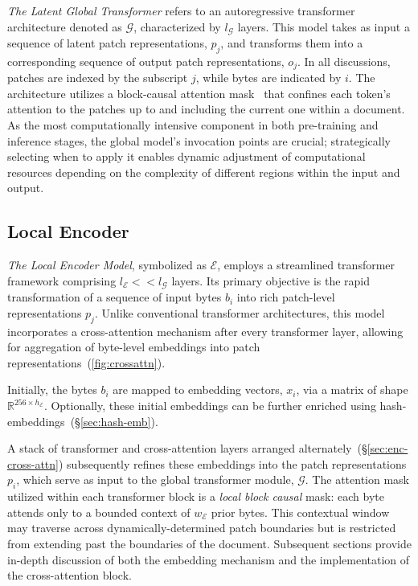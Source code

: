 \textit{The Latent Global Transformer} refers to an autoregressive transformer architecture denoted as $\mathcal{G}$, characterized by $l_{\mathcal{G}}$ layers. This model takes as input a sequence of latent patch representations, $p_j$, and transforms them into a corresponding sequence of output patch representations, $o_j$. In all discussions, patches are indexed by the subscript $j$, while bytes are indicated by $i$. The architecture utilizes a block-causal attention mask~\citep{dubey2024llama} that confines each token’s attention to the patches up to and including the current one within a document. As the most computationally intensive component in both pre-training and inference stages, the global model's invocation points are crucial; strategically selecting when to apply it enables dynamic adjustment of computational resources depending on the complexity of different regions within the input and output.

\subsection{Local Encoder}
\label{section:local}

\textit{The Local Encoder Model}, symbolized as $\mathcal{E}$, employs a streamlined transformer framework comprising $l_{\mathcal{E}} << l_{\mathcal{G}}$ layers. Its primary objective is the rapid transformation of a sequence of input bytes $b_i$ into rich patch-level representations $p_j$. Unlike conventional transformer architectures, this model incorporates a cross-attention mechanism after every transformer layer, allowing for aggregation of byte-level embeddings into patch representations~(\autoref{fig:crossattn}).

Initially, the bytes $b_i$ are mapped to embedding vectors, $x_i$, via a matrix of shape $\mathbb{R}^{256 \times h_{\mathcal{E}}}$. Optionally, these initial embeddings can be further enriched using hash-embeddings~(\S\ref{sec:hash-emb}). 

A stack of transformer and cross-attention layers arranged alternately~(\S\ref{sec:enc-cross-attn}) subsequently refines these embeddings into the patch representations $p_i$, which serve as input to the global transformer module, $\mathcal{G}$. The attention mask utilized within each transformer block is a \textit{local block causal} mask: each byte attends only to a bounded context of $w_{\mathcal{E}}$ prior bytes. This contextual window may traverse across dynamically-determined patch boundaries but is restricted from extending past the boundaries of the document. Subsequent sections provide in-depth discussion of both the embedding mechanism and the implementation of the cross-attention block.

